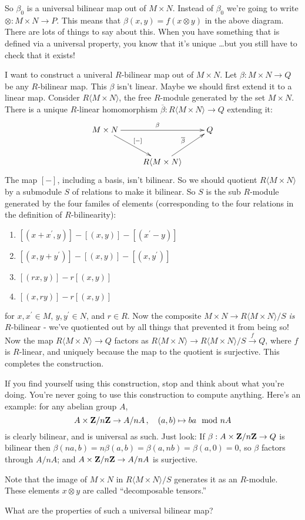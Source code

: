 So $\beta_0$ is a universal bilinear map out of $M\times N$. Instead of $\beta_0$ we're going to write $\otimes:M\times N\rightarrow P$. This means that $\beta(x,y)=f(x\otimes y)$ in the above diagram. There are lots of things to say about this. When you have something that is defined via a universal property, you know that it's unique \ldots but you still have to check that it exists!
\begin{construction}
I want to construct a univeral $R$-bilinear map out of $M\times N$. Let $\beta:M\times N\to Q$ be any $R$-bilinear map. This $\beta$ isn't linear. Maybe we should first extend it to a linear map. Consider $R\langle M\times N\rangle$, the free $R$-module generated by the set $M\times N$. There is a unique $R$-linear homomorphism $\overline{\beta}:R\langle M\times N\rangle\to Q$ extending it:
\begin{equation*}
\xymatrix{M\times N\ar[rr]^\beta\ar[dr]^{[-]} & & Q\\
& R\langle M\times N\rangle\ar[ur]^{\overline{\beta}} &}
\end{equation*}
The map $[-]$, including a basis, isn't bilinear. So we should quotient $R\langle M\times N\rangle$ by a submodule $S$ of relations to make it bilinear. So $S$ is the sub $R$-module generated by the four familes of elements (corresponding to the four relations in the definition of $R$-bilinearity): 
\begin{enumerate}
\item $[(x+x^\prime,y)]-[(x,y)]-[(x^\prime-y)]$
\item $[(x,y+y^\prime)]-[(x,y)]-[(x,y^\prime)]$
\item $[(rx,y)]-r[(x,y)]$
\item $[(x,ry)]-r[(x,y)]$
\end{enumerate}
for $x,x^\prime\in M$, $y,y^\prime\in N$, and $r\in R$. Now the composite
$M\times N\to R\langle M\times N\rangle/S$ {\em is} $R$-bilinear - we've quotiented out by all things that prevented it from being so! Now the map $R\langle M\times N\rangle\to Q$ factors as $R\langle M\times N\rangle\to R\langle M\times N\rangle/S\xrightarrow{f} Q$, where $f$ is $R$-linear, and uniquely because the map to the quotient is surjective. This completes the construction.
\end{construction}

If you find yourself using this construction, stop and think about what you're doing. You're never going to use this construction to compute anything. 
Here's an example: for any abelian group $A$, 
\[
A\times \mathbf Z/n\mathbf Z\to A/nA\,,\quad (a,b)\mapsto ba\mod nA
\]
is clearly bilinear, and is universal as such. Just look: If 
$\beta:A\times\mathbf Z/n\mathbf Z\to Q$ is bilinear then 
$\beta(na,b)=n\beta(a,b)=\beta(a,nb)=\beta(a,0)=0$, so $\beta$ factors through 
$A/nA$; and $A\times\mathbf Z/n\mathbf Z\to A/nA$ is surjective.
\begin{remark}
Note that the image of $M\times N$ in $R\langle M\times N\rangle/S$ generates it as an $R$-module. These elements $x\otimes y$ are called ``decomposable tensors.'' 
\end{remark}
What are the properties of such a universal bilinear map? 


